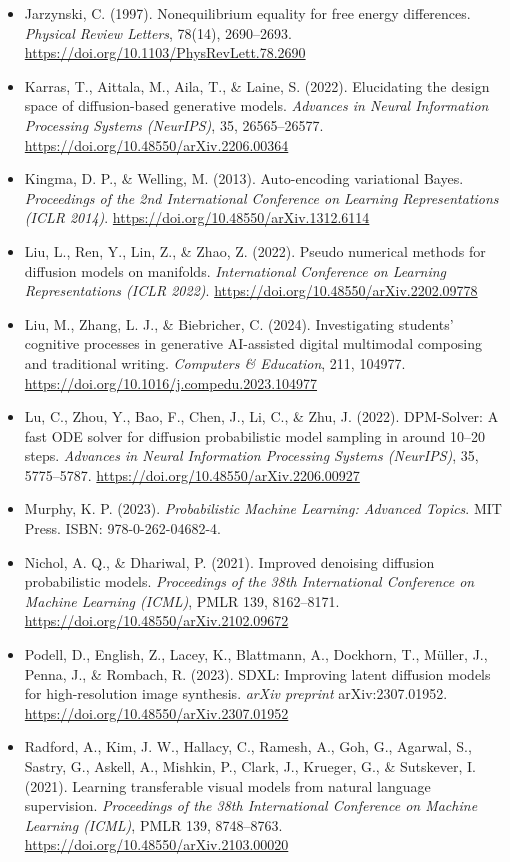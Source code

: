 \begin{itemize}[leftmargin=1.5em, label={}, itemsep=0.22ex, parsep=0pt]
    \item Jarzynski, C. (1997). Nonequilibrium equality for free energy differences. \textit{Physical Review Letters}, 78(14), 2690--2693. \url{https://doi.org/10.1103/PhysRevLett.78.2690}
    \item Karras, T., Aittala, M., Aila, T., \& Laine, S. (2022). Elucidating the design space of diffusion-based generative models. \textit{Advances in Neural Information Processing Systems (NeurIPS)}, 35, 26565--26577. \url{https://doi.org/10.48550/arXiv.2206.00364}
    \item Kingma, D. P., \& Welling, M. (2013). Auto-encoding variational Bayes. \textit{Proceedings of the 2nd International Conference on Learning Representations (ICLR 2014)}. \url{https://doi.org/10.48550/arXiv.1312.6114}
    \item Liu, L., Ren, Y., Lin, Z., \& Zhao, Z. (2022). Pseudo numerical methods for diffusion models on manifolds. \textit{International Conference on Learning Representations (ICLR 2022)}. \url{https://doi.org/10.48550/arXiv.2202.09778}
    \item Liu, M., Zhang, L. J., \& Biebricher, C. (2024). Investigating students' cognitive processes in generative AI-assisted digital multimodal composing and traditional writing. \textit{Computers \& Education}, 211, 104977. \url{https://doi.org/10.1016/j.compedu.2023.104977}
    \item Lu, C., Zhou, Y., Bao, F., Chen, J., Li, C., \& Zhu, J. (2022). DPM-Solver: A fast ODE solver for diffusion probabilistic model sampling in around 10--20 steps. \textit{Advances in Neural Information Processing Systems (NeurIPS)}, 35, 5775--5787. \url{https://doi.org/10.48550/arXiv.2206.00927}
    \item Murphy, K. P. (2023). \textit{Probabilistic Machine Learning: Advanced Topics}. MIT Press. ISBN: 978-0-262-04682-4.
    \item Nichol, A. Q., \& Dhariwal, P. (2021). Improved denoising diffusion probabilistic models. \textit{Proceedings of the 38th International Conference on Machine Learning (ICML)}, PMLR 139, 8162--8171. \url{https://doi.org/10.48550/arXiv.2102.09672}
    \item Podell, D., English, Z., Lacey, K., Blattmann, A., Dockhorn, T., Müller, J., Penna, J., \& Rombach, R. (2023). SDXL: Improving latent diffusion models for high-resolution image synthesis. \textit{arXiv preprint} arXiv:2307.01952. \url{https://doi.org/10.48550/arXiv.2307.01952}
    \item Radford, A., Kim, J. W., Hallacy, C., Ramesh, A., Goh, G., Agarwal, S., Sastry, G., Askell, A., Mishkin, P., Clark, J., Krueger, G., \& Sutskever, I. (2021). Learning transferable visual models from natural language supervision. \textit{Proceedings of the 38th International Conference on Machine Learning (ICML)}, PMLR 139, 8748--8763. \url{https://doi.org/10.48550/arXiv.2103.00020}

\end{itemize}
